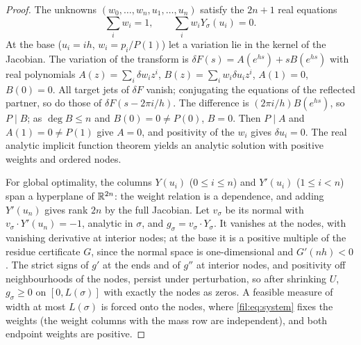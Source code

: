 \begin{proof}
The unknowns $(w_0,\dots,w_n,u_1,\dots,u_n)$ satisfy the $2n+1$ real equations
\begin{equation}\label{fil:eq:system}
 \sum_iw_i=1,\qquad\sum_iw_iY_\sigma(u_i)=0 .
\end{equation}
At the base ($u_i=ih$, $w_i=p_i/P(1)$) let a variation lie in the kernel of the Jacobian. The variation
of the transform is $\delta F(s)=A(e^{hs})+sB(e^{hs})$ with real polynomials
$A(z)=\sum_i\delta w_iz^i$, $B(z)=\sum_iw_i\delta u_iz^i$, $A(1)=0$, $B(0)=0$. All target jets of
$\delta F$ vanish; conjugating the equations of the reflected partner, so do those of
$\delta F(s-2\pi i/h)$. The difference is $(2\pi i/h)B(e^{hs})$, so $P\mid B$; as $\deg B\le n$ and
$B(0)=0\ne P(0)$, $B=0$. Then $P\mid A$ and $A(1)=0\ne P(1)$ give $A=0$, and positivity of the $w_i$
gives $\delta u_i=0$. The real analytic implicit function theorem yields an analytic solution with
positive weights and ordered nodes.

For global optimality, the columns $Y(u_i)$ ($0\le i\le n$) and $Y'(u_i)$ ($1\le i<n$) span a hyperplane
of $\mathbb{R}^{2n}$: the weight relation is a dependence, and adding $Y'(u_n)$ gives rank $2n$ by the full
Jacobian. Let $v_\sigma$ be its normal with $v_\sigma\cdot Y'(u_n)=-1$, analytic in $\sigma$, and
$g_\sigma=v_\sigma\cdot Y_\sigma$. It vanishes at the nodes, with vanishing derivative at interior
nodes; at the base it is a positive multiple of the residue certificate $G$, since the normal space is
one-dimensional and $G'(nh)<0$. The strict signs of $g'$ at the ends and of $g''$ at interior nodes,
and positivity off neighbourhoods of the nodes, persist under perturbation, so after shrinking $U$,
$g_\sigma\ge0$ on $[0,L(\sigma)]$ with exactly the nodes as zeros. A feasible measure of width at most
$L(\sigma)$ is forced onto the nodes, where \eqref{fil:eq:system} fixes the weights (the weight columns
with the mass row are independent), and both endpoint weights are positive.


\end{proof}
